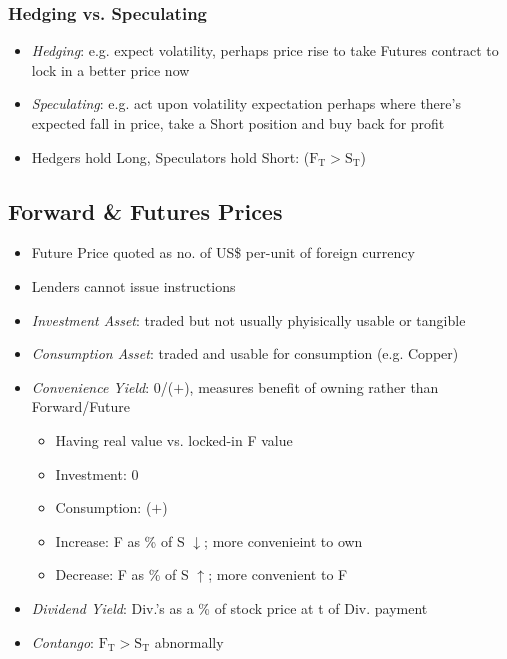 \documentclass[11pt, english]{article}
\begin{document}
		\subsubsection{Hedging vs. Speculating}

	\begin{itemize}        
        \setlength\itemsep{0cm}
		\item \textit{Hedging}: e.g. expect volatility, perhaps price rise to take Futures contract to lock in a better price now
		\item \textit{Speculating}: e.g. act upon volatility expectation perhaps where there's expected fall in price, take a Short position and buy back for profit
		\item Hedgers hold Long, Speculators hold Short: ($\mathrm{F_T>S_T}$)
	\end{itemize}

\newpage

	\subsection{Forward \& Futures Prices}

	\begin{itemize}        
        \setlength\itemsep{0cm}
		\item Future Price quoted as no. of US\$ per-unit of foreign currency
		\item Lenders cannot issue instructions
		\item \textit{Investment Asset}: traded but not usually phyisically usable or tangible
		\item \textit{Consumption Asset}: traded and usable for consumption (e.g. Copper)
		\item \textit{Convenience Yield}: 0/($+$), measures benefit of owning rather than Forward/Future
		\begin{itemize}
			\item Having real value vs. locked-in F value
			\item Investment: 0
			\item Consumption: ($+$)
			\item Increase: F as \% of S $\downarrow$; more convenieint to own
			\item Decrease: F as \% of S $\uparrow$; more convenient to F
		\end{itemize}
		\item \textit{Dividend Yield}: Div.'s as a \% of stock price at t of Div. payment
		\item \textit{Contango}: $\mathrm{F_T>S_T}$ abnormally
	\end{itemize}
\end{document}

